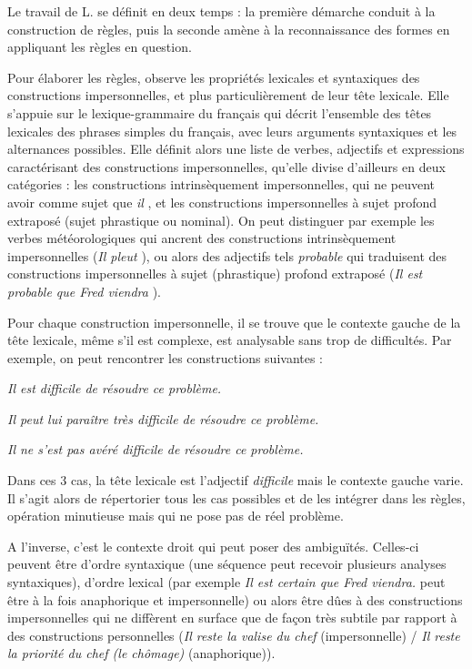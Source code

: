\documentclass[a4paper,12pt]{article}
\begin{document}
Le travail de L. \citeauthor{danlos-ilimp-taln2005} se définit en deux temps : la première démarche conduit à la construction de règles, puis la seconde amène à la reconnaissance des formes %
en appliquant les règles en question.

Pour élaborer les règles, \citeauthor{danlos-ilimp-taln2005} observe les propriétés lexicales et syntaxiques des constructions impersonnelles, et plus particulièrement de leur tête lexicale. Elle s'appuie sur le lexique-grammaire du français %
 qui décrit l'ensemble des têtes lexicales des phrases simples du français, avec leurs arguments syntaxiques et les alternances possibles.
Elle définit alors une liste de verbes, adjectifs et expressions caractérisant des constructions impersonnelles, qu'elle divise d'ailleurs en deux catégories : les constructions intrinsèquement impersonnelles, qui ne peuvent avoir comme sujet que \og \textit{il} \fg{}, et les constructions impersonnelles à sujet profond extraposé (sujet phrastique ou nominal). On peut distinguer par exemple les verbes météorologiques qui ancrent des constructions intrinsèquement impersonnelles (\og \textit{Il pleut} \fg{}), ou alors des adjectifs tels \og \textit{probable} \fg{} qui traduisent des constructions impersonnelles à sujet (phrastique) profond extraposé (\og \textit{Il est probable que Fred viendra} \fg{}).

Pour chaque construction impersonnelle, il se trouve que le contexte gauche de la tête lexicale, même s'il est complexe, est analysable sans trop de difficultés.
Par exemple, on peut rencontrer les constructions suivantes :

\textit{Il est difficile de résoudre ce problème.}

\textit{Il peut lui paraître très difficile de résoudre ce problème.}

\textit{Il ne s'est pas avéré difficile de résoudre ce problème.}

Dans ces 3 cas, la tête lexicale est l'adjectif \og \textit{difficile} \fg{} mais le contexte gauche varie. Il s'agit alors de répertorier tous les cas possibles et de les intégrer dans les règles, opération minutieuse mais qui ne pose pas de réel problème.

A l'inverse, c'est le contexte droit qui peut poser des ambiguïtés. Celles-ci peuvent être d'ordre syntaxique (une séquence peut recevoir plusieurs analyses syntaxiques), d'ordre lexical (par exemple \og{}\textit{Il est certain que Fred viendra.}\fg{} peut être à la fois anaphorique et impersonnelle) ou alors être dûes à des constructions impersonnelles qui ne diffèrent en surface que de façon très subtile par rapport à des constructions personnelles (\og{}\textit{Il reste la valise du chef}\fg{} (impersonnelle) / \og{}\textit{Il reste la priorité du chef (le chômage)}\fg{} (anaphorique)).
\end{document}

